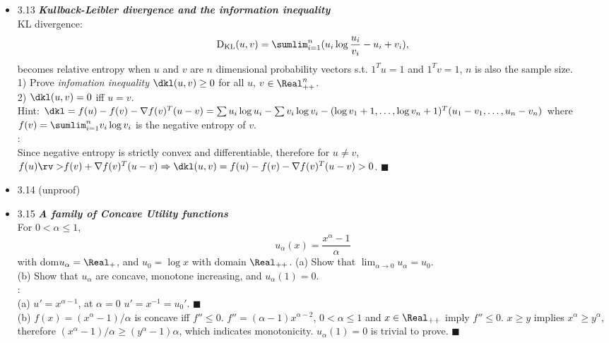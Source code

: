 \begin{itemize}
\item 3.13 {\bf\emph{Kullback-Leibler divergence and the information inequality}} \\ KL divergence:
\begin{equation} 
   \text{D}_{\text{KL}}(u,v)=\sumlim_{i=1}^n(u_i\log{\frac{u_i}{v_i}}-u_i+v_i),
\end{equation} 
becomes relative entropy when $u$ and $v$ are $n$ dimensional probability vectors
s.t. $1^Tu=1$ and $1^Tv=1$, $n$ is also the sample size. \\ 1) Prove \emph{infomation inequality}
$\dkl(u,v) \ge 0$ for all $u$, $v$ $\in \Real^n_{++}$. \\ 2) $\dkl(u,v)=0$ iff $u=v$. \\ Hint: $\dkl
= f(u)-f(v)-\nabla f(v)^T(u-v)= \sum u_i\log u_i - \sum v_i\log v_i - (\log v_1+ 1, \dotsc, \log
v_n+ 1)^T(u_1-v_1,\dotsc, u_n-v_n)$ where $f(v)=\sumlim_{i=1}^n v_i\log v_i$ is the negative entropy
of $v$.\\ \Proof: \\ Since negative entropy is {\rv strictly convex} and differentiable, therefore
for $u\neq v$, $f(u) {\rv >} f(v)+ \nabla f(v)^T(u-v) \Rightarrow \dkl(u,v)= f(u)-f(v)-\nabla
f(v)^T(u-v) > 0$.  $\blacksquare$ \\

\item 3.14 (unproof) 

\item 3.15 {\bf\emph{A family of Concave Utility functions}} \\ For $0<\alpha\le 1$,
\begin{equation} 
   u_\alpha(x)= \frac{x^\alpha- 1}{\alpha} 
\end{equation} 
with dom$u_\alpha = \Real_{+}$, and $u_0=\log x$ with domain $\Real_{++}$.  (a) Show that $\lim_{\alpha \rightarrow 0}
u_\alpha = u_0$. \\ (b) Show that $u_\alpha$ are concave, monotone increasing, and $u_\alpha(1)=0$.
\\ \Proof: \\ (a) $u'= x^{\alpha-1}$, at $\alpha=0$ $u'=x^{-1}=u_0'$.  $\blacksquare$  \\ (b)
$f(x)=(x^\alpha-1)/\alpha$ is concave iff $f''\le 0$.  $f''=(\alpha-1)x^{\alpha-2}$, $0< \alpha\le
1$ and $x\in \Real_{++}$ imply $f''\le 0$.  $x\ge y$ implies $x^\alpha \ge y^\alpha$, therefore
$(x^\alpha-1)/\alpha \ge (y^\alpha-1)\alpha$, which indicates monotonicity.  $u_\alpha(1)=0$ is
trivial to prove.  $\blacksquare$ \\


\end{itemize}
